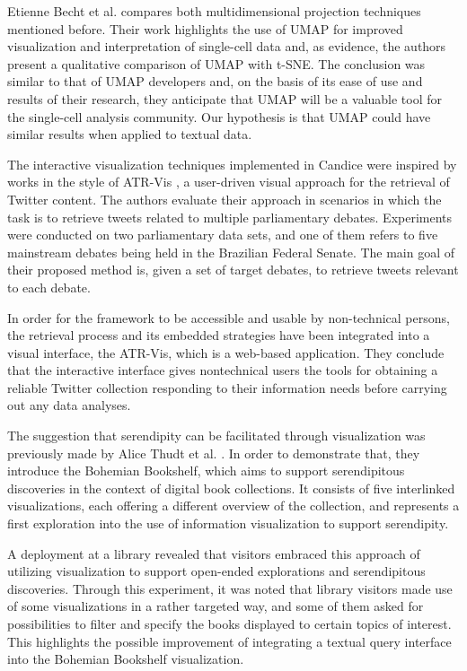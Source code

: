 \documentclass[conference]{IEEEtran}
\begin{document}
Etienne Becht et al. \cite{b6} compares both multidimensional projection techniques mentioned before. Their work highlights the use of UMAP for improved visualization and interpretation of single-cell data and, as evidence, the authors present a qualitative comparison of UMAP with t-SNE. The conclusion was similar to that of UMAP developers \cite{b3} and, on the basis of its ease of use and results of their research, they anticipate that UMAP will be a valuable tool for the single-cell analysis community. Our hypothesis is that UMAP could have similar results when applied to textual data.

The interactive visualization techniques implemented in Candice were inspired by works in the style of ATR-Vis \cite{b7}, a user-driven visual approach for the retrieval of Twitter content. The authors evaluate their approach in scenarios in which the task is to retrieve tweets related to multiple parliamentary debates. Experiments were conducted on two parliamentary data sets, and one of them refers to five mainstream debates being held in the Brazilian Federal Senate. The main goal of their proposed method is, given a set of target debates, to retrieve tweets relevant to each debate. 

In order for the framework to be accessible and usable by non-technical persons, the retrieval process and its embedded strategies have been integrated into a visual interface, the ATR-Vis, which is a web-based application. They conclude that the interactive interface gives nontechnical users the tools for obtaining a reliable Twitter collection responding to their information needs before carrying out any data analyses.

The suggestion that serendipity can be facilitated through visualization was previously made by Alice Thudt et al. \cite{b8}. In order to demonstrate that, they introduce the Bohemian Bookshelf, which aims to support serendipitous discoveries in the context of digital book collections. It consists of five interlinked visualizations, each offering a different overview of the collection, and represents a first exploration into the use of information visualization to support serendipity. 

A deployment at a library revealed that visitors embraced this approach of utilizing visualization to support open-ended explorations and serendipitous discoveries. Through this experiment, it was noted that library visitors made use of some visualizations in a rather targeted way, and some of them asked for possibilities to filter and specify the books displayed to certain topics of interest. This highlights the possible improvement of integrating a textual query interface into the Bohemian Bookshelf visualization. 
\end{document}
